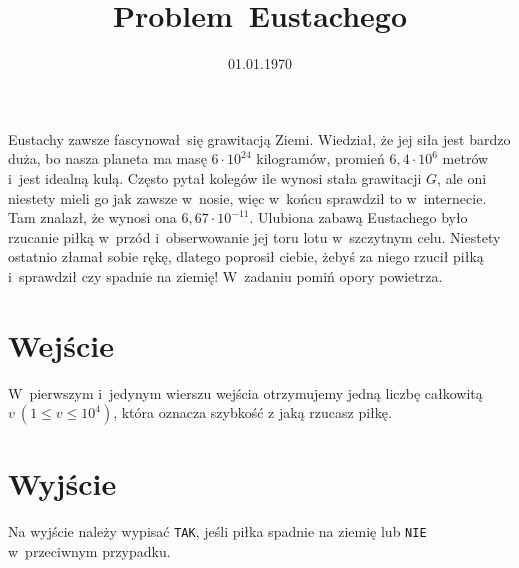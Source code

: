 \documentclass[zad]{soigstyl}
\date{01.01.1970}
\title{\mbox{Problem Eustachego}}
\begin{document}
\begin{tasktext}%
    \noindent
    Eustachy zawsze fascynował~się grawitacją Ziemi.  Wiedział, że jej siła jest bardzo duża, bo nasza planeta ma masę $6 \cdot 10^{24}$ kilogramów, promień $6,4 \cdot 10^6$ metrów i~jest idealną kulą. Często pytał kolegów ile wynosi stała grawitacji $G$, ale oni niestety mieli go jak zawsze w~nosie, więc w~końcu sprawdził to w~internecie. Tam znalazł, że wynosi ona $6,67 \cdot 10^{-11}$. Ulubiona zabawą Eustachego było rzucanie piłką w~przód i~obserwowanie jej toru lotu w~szczytnym celu. Niestety ostatnio złamał sobie rękę, dlatego poprosił ciebie, żebyś za niego rzucił piłką i~sprawdził czy spadnie na ziemię! W~zadaniu pomiń opory powietrza. 
	
    	\section{Wejście}
	W~pierwszym i~jedynym wierszu wejścia otrzymujemy jedną liczbę całkowitą $v~(1 \leqslant v \leqslant 10^4)$, która oznacza szybkość z jaką rzucasz piłkę.

	\section{Wyjście}
	Na wyjście należy wypisać \texttt{TAK}, jeśli piłka spadnie na ziemię lub \texttt{NIE} w~przeciwnym przypadku.
	
	\oigprzyklady
\end{tasktext}
\end{document}
